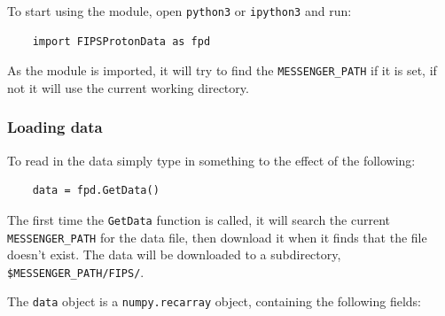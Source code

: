 	To start using the module, open \texttt{python3} or \texttt{ipython3} and run:
	\begin{verbatim}
	import FIPSProtonData as fpd
	\end{verbatim}
	As the module is imported, it will try to find the \texttt{MESSENGER\_PATH} if 
	it is set, if not it will use the current working directory.
	
	\subsubsection{Loading data}
	To read in the data simply type in something to the effect of the 
	following:
	\begin{verbatim}
	data = fpd.GetData()
	\end{verbatim}
	The first time the \texttt{GetData} function is called, it will search the 
	current \texttt{MESSENGER\_PATH} for the data file, then download it when it 
	finds that the file doesn't exist. The data will be downloaded to a 
	subdirectory, \texttt{\$MESSENGER\_PATH/FIPS/}.
	
	The \texttt{data} object is a \texttt{numpy.recarray} object, containing the following
	fields:
	
